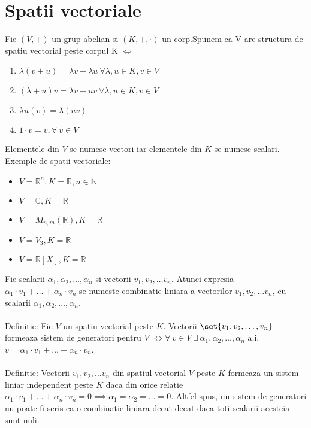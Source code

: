 \documentclass{article}
\begin{document}
        \section{Spatii vectoriale}
        Fie $(V, +)$ un grup abelian si $(K, +, \cdot)$ un corp.Spunem ca V are structura de spatiu vectorial peste corpul K $\iff$
        	\begin{enumerate}
        		\item $\lambda(v + u)= \lambda v + \lambda u\ \forall \lambda, u \in K, v \in V$
        		\item $(\lambda + u)v = \lambda  v + uv\ \forall \lambda, u \in K, v \in V$
        		\item $ \lambda u \left(v\right) = \lambda \left(uv\right)$
        		\item $1 \cdot v = v, \forall \ v \in V$
        	\end{enumerate}
        Elementele din $V$ se numesc vectori iar elementele din $K$ se numesc scalari.\\
        Exemple de spatii vectoriale:
        \begin{itemize}
        	\item $V = \mathbb{R}^{n}, K = \mathbb{R}, n \in \mathbb{N}$
        	\item $V = \mathbb{C}, K = \mathbb{R}$
        	\item $V = M_{n,m}(\mathbb{R}), K = \mathbb{R}$
        	\item $V = V_{3}, K = \mathbb{R}$
        	\item $V = \mathbb{R}[X], K = \mathbb{R}$
        \end{itemize}
        Fie scalarii $\alpha_{1}, \alpha_{2}, \dots, \alpha_{n}$ si vectorii $v_{1}, v_{2}, \dots v_{n}$. Atunci expresia $\alpha_{1} \cdot v_{1} + \dots + \alpha_{n} \cdot v_{n}$ se numeste combinatie liniara a vectorilor $v_{1}, v_{2}, \dots v_{n}$, cu scalarii $\alpha_{1}, \alpha_{2}, \dots, \alpha_{n}$. \\ \\
        Definitie: Fie $V$ un spatiu vectorial peste $K$. Vectorii $\set{ v_{1}, v_2, \dots, v_{n}}$ formeaza sistem de generatori pentru $V$ $\iff \forall\ v \in V\ \exists\ \alpha_{1}, \alpha_{2}, \dots , \alpha_{n}$ a.i. $v = \alpha_{1} \cdot v_{1} + \dots + \alpha_{n} \cdot v_{n}$. \\ \\
        Definitie: Vectorii $v_{1}, v_{2}, \dots v_{n}$ din spatiul vectorial $V$ peste $K$ formeaza un sistem liniar independent peste $K$ daca din orice relatie $\alpha_{1} \cdot v_{1} + \dots + \alpha_{n} \cdot v_{n} = 0 \implies \alpha_{1} = \alpha_{2} = \dots = 0$. Altfel spus, un sistem de generatori nu poate fi scris ca o combinatie liniara decat decat daca toti scalarii acesteia sunt nuli. \\ \\
\end{document}
